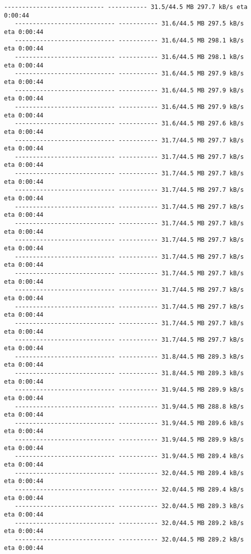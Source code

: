 \documentclass[11pt]{article}
\begin{document}
\begin{Verbatim}[commandchars=\\\{\}]
   ---------------------------- ----------- 31.5/44.5 MB 297.7 kB/s eta 0:00:44
   ---------------------------- ----------- 31.6/44.5 MB 297.5 kB/s eta 0:00:44
   ---------------------------- ----------- 31.6/44.5 MB 298.1 kB/s eta 0:00:44
   ---------------------------- ----------- 31.6/44.5 MB 298.1 kB/s eta 0:00:44
   ---------------------------- ----------- 31.6/44.5 MB 297.9 kB/s eta 0:00:44
   ---------------------------- ----------- 31.6/44.5 MB 297.9 kB/s eta 0:00:44
   ---------------------------- ----------- 31.6/44.5 MB 297.9 kB/s eta 0:00:44
   ---------------------------- ----------- 31.6/44.5 MB 297.6 kB/s eta 0:00:44
   ---------------------------- ----------- 31.7/44.5 MB 297.7 kB/s eta 0:00:44
   ---------------------------- ----------- 31.7/44.5 MB 297.7 kB/s eta 0:00:44
   ---------------------------- ----------- 31.7/44.5 MB 297.7 kB/s eta 0:00:44
   ---------------------------- ----------- 31.7/44.5 MB 297.7 kB/s eta 0:00:44
   ---------------------------- ----------- 31.7/44.5 MB 297.7 kB/s eta 0:00:44
   ---------------------------- ----------- 31.7/44.5 MB 297.7 kB/s eta 0:00:44
   ---------------------------- ----------- 31.7/44.5 MB 297.7 kB/s eta 0:00:44
   ---------------------------- ----------- 31.7/44.5 MB 297.7 kB/s eta 0:00:44
   ---------------------------- ----------- 31.7/44.5 MB 297.7 kB/s eta 0:00:44
   ---------------------------- ----------- 31.7/44.5 MB 297.7 kB/s eta 0:00:44
   ---------------------------- ----------- 31.7/44.5 MB 297.7 kB/s eta 0:00:44
   ---------------------------- ----------- 31.7/44.5 MB 297.7 kB/s eta 0:00:44
   ---------------------------- ----------- 31.7/44.5 MB 297.7 kB/s eta 0:00:44
   ---------------------------- ----------- 31.8/44.5 MB 289.3 kB/s eta 0:00:44
   ---------------------------- ----------- 31.8/44.5 MB 289.3 kB/s eta 0:00:44
   ---------------------------- ----------- 31.9/44.5 MB 289.9 kB/s eta 0:00:44
   ---------------------------- ----------- 31.9/44.5 MB 288.8 kB/s eta 0:00:44
   ---------------------------- ----------- 31.9/44.5 MB 289.6 kB/s eta 0:00:44
   ---------------------------- ----------- 31.9/44.5 MB 289.9 kB/s eta 0:00:44
   ---------------------------- ----------- 31.9/44.5 MB 289.4 kB/s eta 0:00:44
   ---------------------------- ----------- 32.0/44.5 MB 289.4 kB/s eta 0:00:44
   ---------------------------- ----------- 32.0/44.5 MB 289.4 kB/s eta 0:00:44
   ---------------------------- ----------- 32.0/44.5 MB 289.3 kB/s eta 0:00:44
   ---------------------------- ----------- 32.0/44.5 MB 289.2 kB/s eta 0:00:44
   ---------------------------- ----------- 32.0/44.5 MB 289.2 kB/s eta 0:00:44

\end{Verbatim}
\end{document}
